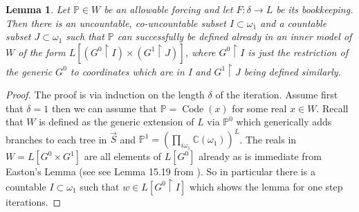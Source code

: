 \documentclass[a4paper,11pt]{article}
\newtheorem{lemma}[theorem]{Lemma}
\newcommand{\forceP}{\mathbb{P}}
\begin{document}
\begin{lemma}\label{DefinabilityInProperInnerModels}
    Let $\forceP \in W$ be an allowable forcing and let $F: \delta \rightarrow L$ be its bookkeeping. Then there is an uncountable, co-uncountable subset $I \subset \omega_1$ and a countable subset $J \subset \omega_1$ such that
    $\forceP$ can successfully be defined already in an inner model of $W$ of the form
    $L[(G^0 \upharpoonright I)  \times (G^1 \upharpoonright J)]$, where $G^0 \upharpoonright I$ is just the restriction of the generic $G^0$ to coordinates which are in I and $G^1 \upharpoonright J$ being defined similarly.
\end{lemma}
\begin{proof}
    The proof is via induction on the length $\delta$ of the iteration.
    Assume first that $\delta=1$ then we can assume that $\forceP = \operatorname{Code} (x)$ for some real $x \in W$. Recall that $W$ is defined as the generic extension of $L$ via $\forceP^0$ which generically adds branches to each tree in $\vec{S}$ and $\forceP^1= (\prod_{i \omega_1} \mathbb{C} (\omega_1))^L$. The reals in $W= L[G^0 \times G^1]$ are all elements of $L[G^0]$ already as is immediate from Easton's Lemma (see see Lemma 15.19 from \cite{Jech}). So in particular there is a countable $I \subset \omega_1$ such that $w \in L[G^0 \upharpoonright I]$ which shows the lemma for one step iterations.


\end{proof}
\end{document}
